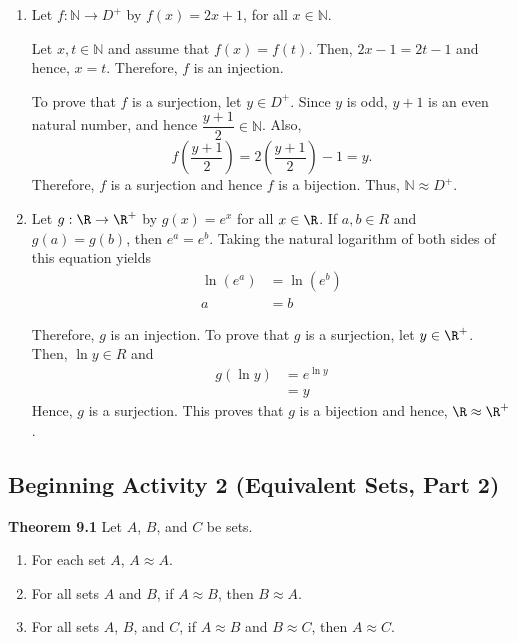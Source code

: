 \documentclass[11pt]{article}
\begin{document}
\begin{enumerate}
\item Let $f:\mathbb{N} \to D^+$ by $f \left( x \right) = 2x + 1$, for all $x \in \mathbb{N}$.

Let $x, t \in \mathbb{N}$ and assume that $f \left( x \right) = f \left( t \right)$.  Then,
$2x - 1 = 2t - 1$ and hence, $x = t$.  Therefore, $f$ is an injection.  

To prove that $f$ is a surjection, let $y \in D^+$.  Since $y$ is odd, $y + 1$ is an even natural number, and hence $\dfrac{y+1}{2} \in \mathbb{N}$.  Also,
\[
f \left( \frac{y+1}{2} \right) = 2 \left( \frac{y+1}{2} \right) - 1 = y.
\]
Therefore, $f$ is a surjection and hence $f$ is a bijection.  Thus, $\mathbb{N} \approx D^+$.

\item Let $g:\R \to \R^+$ by $g(x) = e^x$ for all $x \in \R$.  If $a, b \in R$ and 
$g(a) = g(b)$, then $e^a = e^b$.  Taking the natural logarithm of both sides of this equation yields
\begin{align*}
\ln \left( e^a \right) &= \ln \left( e^b \right) \\
                     a &= b
\end{align*}

Therefore, $g$ is an injection.  To prove that $g$ is a surjection, let $y \in \R^+$.  Then, $\ln y \in R$ and 
\begin{align*}
g \left( \ln y \right) &= e^{\ln y} \\
                       &= y
\end{align*}
Hence, $g$ is a surjection.  This proves that $g$ is a bijection and hence, 
$\R \approx \R^+$.
\end{enumerate}
\hbreak




\subsection*{Beginning Activity 2 (Equivalent Sets, Part 2)}
\renewcommand{\labelenumi}{(\textbf{\alph{enumi}})}

\noindent
\textbf{Theorem 9.1}  Let $A$, $B$, and $C$ be sets.

\begin{enumerate}
\item For each set $A$, $A \approx A$.  \label{T:equivsets1}

\item For all sets $A$ and $B$, if $A \approx B$, then 
$B \approx A$.  \label{T:equivsets2}

\item For all sets $A$, $B$, and $C$, if $A \approx B$ and 
$B \approx C$, then $A \approx C$.  \label{T:equivsets3}
\end{enumerate}
\end{document}
